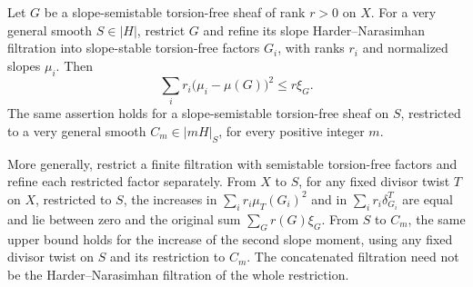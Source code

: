 \begin{lemma}\label{lem:restriction-variance}
Let $G$ be a slope-semistable torsion-free sheaf of rank $r>0$ on $X$.
For a very general smooth $S\in|H|$, restrict $G$ and refine its slope
Harder--Narasimhan filtration into slope-stable torsion-free factors
$G_i$, with ranks $r_i$ and normalized slopes $\mu_i$.  Then
\begin{equation}\label{eq:restriction-variance}
 \sum_i r_i\bigl(\mu_i-\mu(G)\bigr)^2\le r\xi_G.
\end{equation}
The same assertion holds for a slope-semistable torsion-free sheaf on
$S$, restricted to a very general smooth $C_m\in|mH|_S$, for every
positive integer $m$.

More generally, restrict a finite filtration with semistable
torsion-free factors and refine each restricted factor separately.
From $X$ to $S$, for any fixed divisor twist $T$ on $X$, restricted
to $S$, the increases in
$\sum_i r_i\mu_T(G_i)^2$ and in $\sum_i r_i\delta_{G_i}^T$ are equal
and lie between zero and the original sum $\sum_G r(G)\xi_G$.
From $S$ to $C_m$, the same upper bound holds for the increase of the
second slope moment, using any fixed divisor twist on $S$ and its
restriction to $C_m$.  The concatenated filtration need not be the
Harder--Narasimhan filtration of the whole restriction.
\end{lemma}

